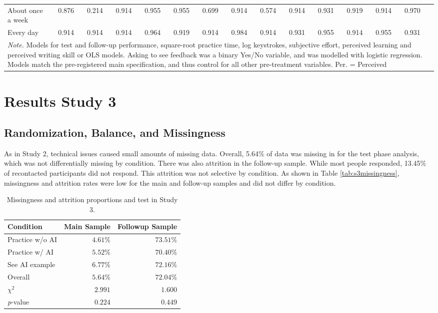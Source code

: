 \documentclass[11pt]{report}
\begin{document}
\begin{append}
\begin{table}[ht]
\begin{tabular}{@{\extracolsep{-4pt}}lcccccccccccccc}
About once a week        & 0.876 & 0.214 & 0.914 & 0.955 & 0.955 & 0.699 & 0.914 & 0.574 & 0.914 & 0.931 & 0.919 & 0.914 & 0.970 \\ 
Every day                & 0.914 & 0.914 & 0.914 & 0.964 & 0.919 & 0.914 & 0.984 & 0.914 & 0.931 & 0.955 & 0.914 & 0.955 & 0.931 \\ 
\midrule
\multicolumn{14}{p{\textwidth}}{\textit{Note.} Models for test and follow-up performance, square-root practice time, log keystrokes, subjective effort, perceived learning and perceived writing skill or OLS models. Asking to see feedback was a binary Yes/No variable, and was modelled with logistic regression. Models match the pre-registered main specification, and thus control for all other pre-treatment variables. Per. = Perceived}
\vspace{5pt}
    \end{tabular}
\end{table}

\section{Results Study 3}
\subsection{Randomization, Balance, and Missingness}

As in Study 2, technical issues caused small amounts of missing data. Overall, 5.64\% of data was missing in for the test phase analysis, which was not differentially missing by condition. 
There was also attrition in the follow-up sample. While most people responded, 13.45\% of recontacted participants did not respond. This attrition was not selective by condition. As shown in Table \ref{tab:s3missingness}, missingness and attrition rates were low for the main and follow-up samples and did not differ by condition.


\begin{table}[ht]
    \centering
    \caption{Missingness and attrition proportions and test in Study 3.}
\begin{tabular}{lrr}
\toprule
Condition & Main Sample & Followup Sample \\ 
\midrule\addlinespace[2.5pt]
Practice w/o AI & $4.61\%$ & $73.51\%$ \\ 
Practice w/ AI & $5.52\%$ & $70.40\%$ \\ 
See AI example & $6.77\%$ & $72.16\%$ \\ 
\midrule
Overall & $5.64\%$ & $72.04\%$ \\ 
\midrule
$\chi^2$ & $2.991$ & $1.600$ \\ 
\textit{p}-value & $0.224$ & $0.449$ \\ 
\bottomrule
\end{tabular}


\end{table}
\end{append}
\end{document}
